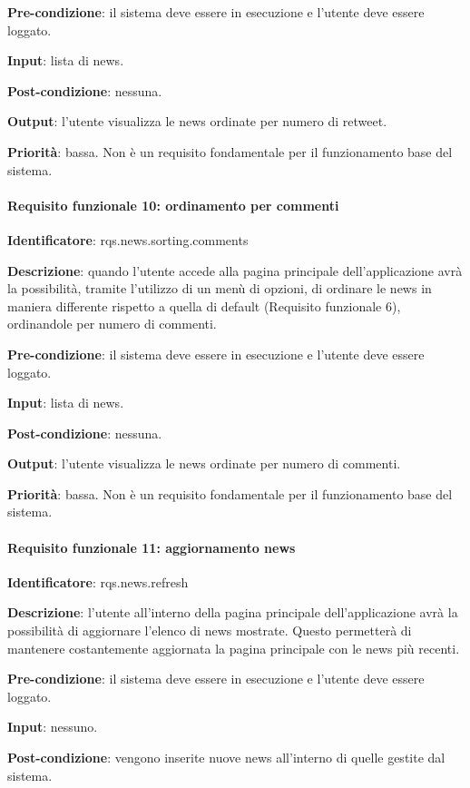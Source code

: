 \documentclass[12pt]{article}
\begin{document}
\textbf{Pre-condizione}: il sistema deve essere in esecuzione e l'utente deve essere loggato.

\textbf{Input}: lista di news.

\textbf{Post-condizione}: nessuna.

\textbf{Output}: l'utente visualizza le news ordinate per numero di retweet.

\textbf{Priorità}: bassa. Non è un requisito fondamentale per il funzionamento base del sistema.

\paragraph{Requisito funzionale 10: ordinamento per commenti}

\textbf{Identificatore}: rqs.news.sorting.comments

\textbf{Descrizione}: quando l'utente accede alla pagina principale dell'applicazione avrà la possibilità, tramite l'utilizzo di un menù di opzioni, di ordinare le news in maniera differente rispetto a quella di default (Requisito funzionale 6), ordinandole per numero di commenti.

\textbf{Pre-condizione}: il sistema deve essere in esecuzione e l'utente deve essere loggato.

\textbf{Input}: lista di news.

\textbf{Post-condizione}: nessuna.

\textbf{Output}: l'utente visualizza le news ordinate per numero di commenti.

\textbf{Priorità}: bassa. Non è un requisito fondamentale per il funzionamento base del sistema.

\paragraph{Requisito funzionale 11: aggiornamento news}

\textbf{Identificatore}: rqs.news.refresh

\textbf{Descrizione}: l'utente all'interno della pagina principale dell'applicazione avrà la possibilità di aggiornare l'elenco di news mostrate. Questo permetterà di mantenere costantemente aggiornata la pagina principale con le news più recenti.

\textbf{Pre-condizione}: il sistema deve essere in esecuzione e l'utente deve essere loggato.

\textbf{Input}: nessuno.

\textbf{Post-condizione}: vengono inserite nuove news all'interno di quelle gestite dal sistema.
\end{document}
